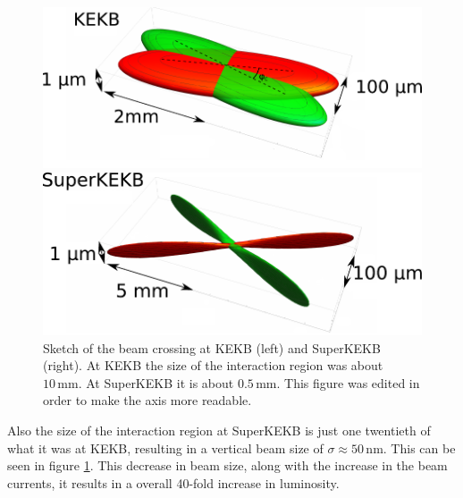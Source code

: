 \documentclass[a4paper,11pt,twosided,final,german,openbib,pdftex,listof=totoc,bibliography=totoc]{scrbook}
\begin{document}
\begin{figure}[h!]
	\centering
	\begin{minipage}[b]{0.45\linewidth}
		\centering
		\includegraphics[width=\textwidth]{Bilder/BeamBelle}
	\end{minipage}
	\hspace{0.5cm}
	\begin{minipage}[b]{0.45\linewidth}
		\centering
		\includegraphics[width=\textwidth]{Bilder/SuperKEKBBeam}
	\end{minipage}
		\caption[Sketch Of The Beam Crossing For KEKB And SuperKEKB]{Sketch of the beam crossing at KEKB (left) and SuperKEKB (right). At KEKB the size of the interaction region was about $10\,\textrm{mm}$. At SuperKEKB it is about $0.5\,\textrm{mm}$.\cite{Beamsize} This figure was edited in order to make the axis more readable.}
	\label{fig:beamsize}

\end{figure}







Also the size of the interaction region at SuperKEKB is just one twentieth of what it was at KEKB, resulting in a vertical beam size of $\sigma \approx 50\,\textrm{nm} $. This can be seen in figure \ref{fig:beamsize}. This decrease in beam size, along with the increase in the beam currents, it results in a overall 40-fold increase in luminosity.  \cite{B2TR} \cite{B2B}
\end{document}

